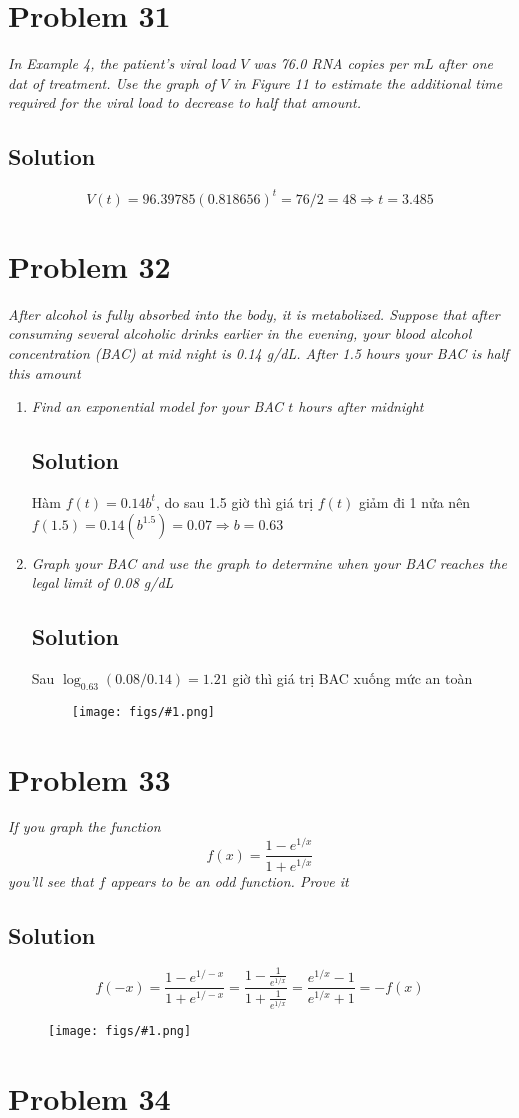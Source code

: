 \documentclass[11pt]{article}
\newcommand{\soln}{\subsection*}
\newcommand{\qn}{\textit}
\newcommand{\imgsoln}[1]{
	\begin{figure}[H]
		\centering
		\texttt{[image: figs/\#1.png]}
	\end{figure}
}
\begin{document}
\section*{Problem 31}

\qn{In Example 4, the patient's viral load $V$ was 76.0 RNA copies per mL after one dat of treatment. Use the graph of $V$ in Figure 11 to estimate the additional time required for the viral load to decrease to half that amount.}

\soln{Solution}
$$V(t)=96.39785(0.818656)^t=76/2=48 \Rightarrow t=3.485$$

\section*{Problem 32}

\qn{After alcohol is fully absorbed into the body, it is metabolized. Suppose that after consuming several alcoholic drinks earlier in the evening, your blood alcohol concentration (BAC) at mid night is 0.14 g/dL. After 1.5 hours your BAC is half this amount}

\begin{enumerate}
	\item \qn{Find an exponential model for your BAC $t$ hours after midnight}
	\soln{Solution}
	Hàm $f(t)=0.14b^t$, do sau 1.5 giờ thì giá trị $f(t)$ giảm đi 1 nửa nên $f(1.5)=0.14(b^{1.5})=0.07 \Rightarrow b = 0.63$ 
	
	\item \qn{Graph your BAC and use the graph to determine when your BAC reaches the legal limit of 0.08 g/dL}
	\soln{Solution}
	Sau $\log_{0.63}(0.08/0.14)=1.21$ giờ thì giá trị BAC xuống mức an toàn
	\imgsoln{1.4.32-ans.b}
\end{enumerate}

\section*{Problem 33}

\qn{If you graph the function $$f(x)=\frac{1-e^{1/x}}{1+e^{1/x}}$$ you'll see that $f$ appears to be an odd function. Prove it}

\soln{Solution}
$$f(-x)=\frac{1-e^{1/-x}}{1+e^{1/-x}}=\frac{1-\frac{1}{e^{1/x}}}{1+\frac{1}{e^{1/x}}}=\frac{e^{1/x}-1}{e^{1/x}+1}=-f(x)$$
\imgsoln{1.4.33-ans}

\section*{Problem 34}
\end{document}
